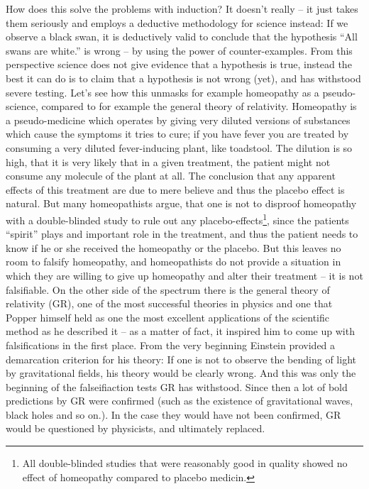 How does this solve the problems with induction?
It doesn't really -- it just takes them seriously and
employs a deductive methodology for science instead:
If we observe a black swan, it is deductively valid to conclude
that the hypothesis \enquote{All swans are white.} is wrong --
by using the power of counter-examples.
From this perspective science does not
give evidence that a hypothesis is true,
instead the best it can do is to claim that a hypothesis is not
wrong (yet), and has withstood severe testing.
Let's see how this unmasks for example homeopathy as a
pseudo-science, compared to for example the general theory of relativity.
Homeopathy is a pseudo-medicine which operates by giving very diluted
versions of substances which cause the symptoms it tries to cure; if
you have fever you are treated by consuming a very diluted
fever-inducing plant, like toadstool.
The dilution is so high, that it is very likely that in a given treatment,
the patient might not consume any molecule of the plant at all.
The conclusion that any apparent effects of this treatment are due to
mere believe and thus the placebo effect is natural.
But many homeopathists argue, that one is not to disproof homeopathy
with a double-blinded study to rule out any placebo-effects\footnote{
    All double-blinded studies that were reasonably good in quality showed no effect of
    homeopathy compared to placebo medicin\cite{mathie2017randomised}.},
since the patients \enquote{spirit} plays and important role in the treatment,
and thus the patient needs to know if he or she received the homeopathy or the placebo.
But this leaves no room to falsify homeopathy, and homeopathists do not provide
a situation in which they are willing to give up homeopathy and alter their treatment --
it is not falsifiable.
On the other side of the spectrum there is the general theory of relativity (GR),
one of the most successful theories in physics and one that Popper himself
held as one the most excellent applications of the scientific method as he
described it -- as a matter of fact, it inspired him to come up with falsifications
in the first place.
From the very beginning Einstein provided a demarcation criterion for his theory:
If one is not to observe the bending of light by gravitational fields, his theory
would be clearly wrong. And this was only the beginning of the falseifiaction tests GR
has withstood. Since then a lot of bold predictions by GR were confirmed
(such as the existence of gravitational waves, black holes and so on.).
In the case they would have not been confirmed, GR would be questioned by physicists, and
ultimately replaced.

